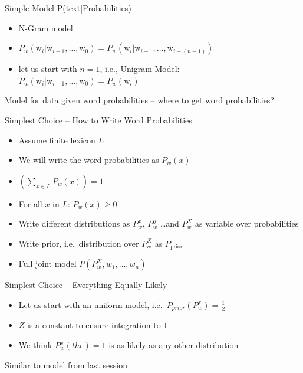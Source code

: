 \documentclass[11pt]{beamer}
\begin{document}
	\begin{frame}{Simple Model P(text|Probabilities)}
		\begin{itemize}
			\item N-Gram model
			\item $P_w(\text{w}_i|\text{w}_{i-1},\dots,\text{w}_{0}) = P_w(\text{w}_i|\text{w}_{i-1},\dots,\text{w}_{i-(n-1)})$
			\item let us start with $n=1$, i.e., Unigram Model: $P_w(\text{w}_i|\text{w}_{i-1},\dots,\text{w}_{0}) = P_w(\text{w}_i)$ 
		\end{itemize}
		
		\vspace{10pt}Model for data given word probabilities -- where to get word probabilities?
	\end{frame}
	
	\begin{frame}{Simplest Choice -- How to Write Word Probabilities}
		\begin{itemize}
			\item Assume finite lexicon $L$
			\item We will write the word probabilities as $P_w(x)$
			\item $\left( \sum_{x \in L} P_w(x) \right) = 1$
			\item For all $x$ in $L$: $P_w(x) \geq 0$
			\item Write different distributions as $P_{w}^{x}$, $P_{w}^{y}$ \dots and $P_{w}^{X}$ as variable over probabilities
			\item Write prior, i.e.\ distribution over $P_{w}^{X}$ as $P_{\text{prior}}$
			\item Full joint model $P\left( P_{w}^{X},w_1,\dots,w_n \right)$
		\end{itemize}
	\end{frame}
	
	\begin{frame}{Simplest Choice -- Everything Equally Likely}
		\begin{itemize}
			\item Let us start with an uniform model, i.e.\ $P_{prior}\left( P^{x}_{w} \right) = \frac{1}{Z}$
			\item $Z$ is a constant to ensure integration to $1$
			\item We think $P^{x}_{w}(the) = 1$ is as likely as any other distribution
		\end{itemize}
		
		\vspace{10pt}Similar to model from last session
	\end{frame}
	
\end{document}
